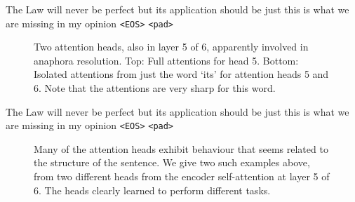 \documentclass[12pt, a4paper]{article}
\begin{document}
The Law will never be perfect but its application should be just this is what we are missing in my opinion \texttt{<EOS>} \texttt{<pad>}

\begin{figure}[ht]
\centering
\caption{Two attention heads, also in layer 5 of 6, apparently involved in anaphora resolution. Top: Full attentions for head 5. Bottom: Isolated attentions from just the word `its' for attention heads 5 and 6. Note that the attentions are very sharp for this word.}
\label{fig:attention2}
\end{figure}

The Law will never be perfect but its application should be just this is what we are missing in my opinion \texttt{<EOS>} \texttt{<pad>}

\begin{figure}[ht]
\centering
\caption{Many of the attention heads exhibit behaviour that seems related to the structure of the sentence. We give two such examples above, from two different heads from the encoder self-attention at layer 5 of 6. The heads clearly learned to perform different tasks.}
\label{fig:attention3}
\end{figure}
\end{document}
